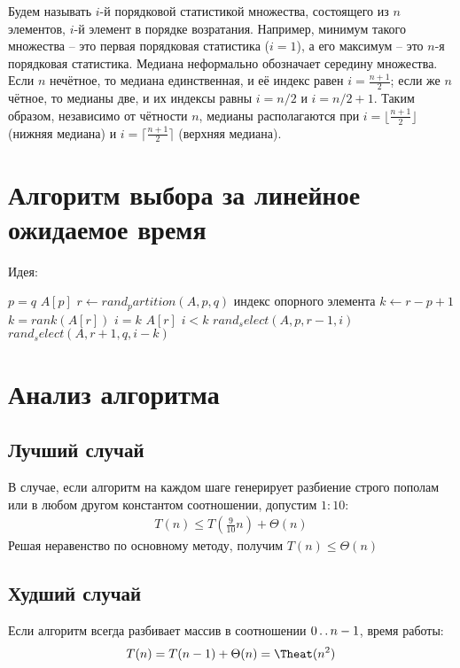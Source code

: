 \documentclass[11pt]{article}
\begin{document}
Будем называть $i$-й порядковой статистикой множества, состоящего из $n$ элементов, $i$-й элемент в порядке возратания. Например, минимум такого множества -- это первая порядковая статистика ($i = 1$), а его максимум -- это $n$-я порядковая статистика. Медиана неформально обозначает середину множества. Если $n$ нечётное, то медиана единственная, и её индекс равен $i = \frac{n+1}{2}$; если же $n$ чётное, то медианы две, и их индексы равны $i=n/2$ и $i=n/2 +1$. Таким образом, независимо от чётности $n$, медианы располагаются при $i = \lfloor \frac{n+1}{2} \rfloor$ (нижняя медиана) и $i = \lceil \frac{n+1}{2} \rceil$ (верхняя медиана).

\section{Алгоритм выбора за линейное ожидаемое время}

Идея: 

\begin{codebox}
\li \If $p = q$
\li \Then \Return $A[p]$
\li $r \gets rand_partition(A, p, q)$ \Comment индекс опорного элемента
\li $k \gets r - p + 1$ \Comment $k = rank(A[r])$
\li \If $i = k$
\li \Then \Return $A[r]$
\li \ElseIf $i < k$
\li \Then \Return $rand_select(A, p, r-1, i)$
\li \Else \Return $rand_select(A, r+1, q, i-k)$
\end{codebox}

\section{Анализ алгоритма}

\subsection{Лучший случай}
В случае, если алгоритм на каждом шаге генерирует разбиение строго пополам или в любом другом константом соотношении, допустим $1:10$:
\begin{align*}
  T(n) \leqslant T(\frac{9}{10}n) + \Theta(n)
\end{align*}
Решая неравенство по основному методу, получим $T(n) \leqslant \Theta(n)$

\subsection{Худший случай}

Если алгоритм всегда разбивает массив в соотношении $0 \mathinner{\ldotp\ldotp} n-1$, время работы:
\begin{equation*}
  T(n) = T(n-1) + \Theta(n) = \Theat(n^2)
\end{equation*}
\end{document}
